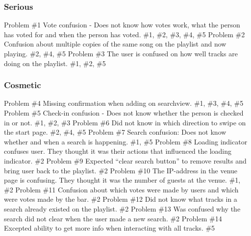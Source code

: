 \subsubsection{Serious}
Problem \#1
    Vote confusion - Does not know how votes work, what the person has voted for and when the person has voted.
    \#1, \#2, \#3, \#4, \#5
Problem \#2
    Confusion about multiple copies of the same song on the playlist and now playing.
    \#2, \#4, \#5
Problem \#3
    The user is confused on how well tracks are doing on the playlist.
    \#1, \#2, \#5

\subsubsection{Cosmetic}
Problem \#4
    Missing confirmation when adding on searchview.
    \#1, \#3, \#4, \#5
Problem \#5
Check-in confusion - Does not know whether the person is checked in or not.
\#1, \#2, \#3
Problem \#6
Did not know in which direction to swipe on the start page.
\#2, \#4, \#5
Problem \#7
    Search confusion: Does not know whether and when a search is happening.
    \#1, \#5
Problem \#8
    Loading indicator confuses user. They thought it was their actions that influenced the loading indicator.
    \#2
Problem \#9
    Expected “clear search button” to remove results and bring user back to the playlist.
    \#2
Problem \#10
    The IP-address in the venue page is confusing. They thought it was the number of guests at the venue.
    \#1, \#2
Problem \#11
Confusion about which votes were made by users and which were votes made by the bar.
    \#2
Problem \#12
    Did not know what tracks in a search already existed on the playlist.
    \#2
Problem \#13
    Was confused why the search did not clear when the user made a new search.
    \#2
Problem \#14
    Excepted ability to get more info when interacting with all tracks.
\#5




